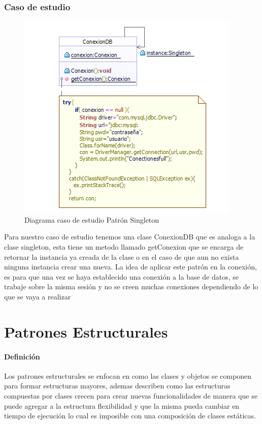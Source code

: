 \subsubsection{Caso de estudio}
\begin{figure}[th!]
	\centering
	\includegraphics[width=0.7\linewidth]{arquitectura/imagenes/PatronSingeltonCasoEstudio}
	\caption{Diagrama caso de estudio Patrón Singleton}
\end{figure}

Para nuestro caso de estudio tenemos una clase ConexionDB que es analoga a la clase singleton, esta tiene un metodo llamado getConexion que se encarga de retornar la instancia ya creada de la clase o en el caso de que aun no exista ninguna instancia crear una nueva.\newline
La idea de  aplicar este patrón en la conexión, es para que una vez se haya establecido una conexión a la base de datos, se trabaje sobre la misma sesión y no se creen muchas conexiones dependiendo de lo que se vaya a realizar  

\newpage

\section{Patrones Estructurales}
\paragraph{Definición}
Los patrones estructurales se enfocan en como las clases y objetos se componen para formar estructuras mayores, ademas describen como las estructuras compuestas por clases crecen para crear nuevas funcionalidades de manera que se puede agregar a la estructura flexibilidad y que la misma pueda cambiar en tiempo de ejecución lo cual es imposible con una composición de clases estáticas.
